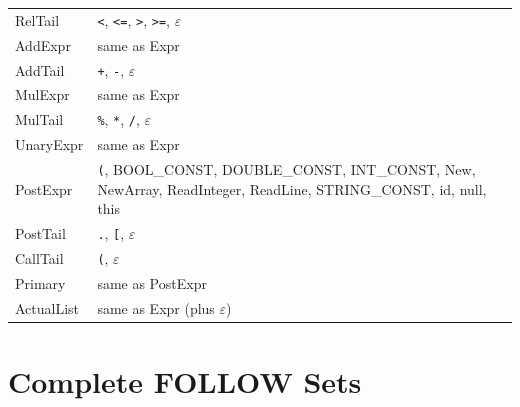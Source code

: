 \documentclass[12pt,a4paper]{article}
\begin{document}
\begin{longtable}{lp{10cm}}
RelTail        & \texttt{<}, \texttt{<=}, \texttt{>}, \texttt{>=}, $\varepsilon$ \\
AddExpr        & same as Expr \\
AddTail        & \texttt{+}, \texttt{-}, $\varepsilon$ \\
MulExpr        & same as Expr \\
MulTail        & \texttt{\%}, \texttt{*}, \texttt{/}, $\varepsilon$ \\
UnaryExpr      & same as Expr \\
PostExpr       & \texttt{(}, BOOL\_CONST, DOUBLE\_CONST, INT\_CONST, New, NewArray, ReadInteger, ReadLine, STRING\_CONST, id, null, this \\
PostTail       & \texttt{.}, \texttt{[}, $\varepsilon$ \\
CallTail       & \texttt{(}, $\varepsilon$ \\
Primary        & same as PostExpr \\
ActualList     & same as Expr (plus $\varepsilon$) \\
\end{longtable}

\section{Complete FOLLOW Sets}
\end{document}
